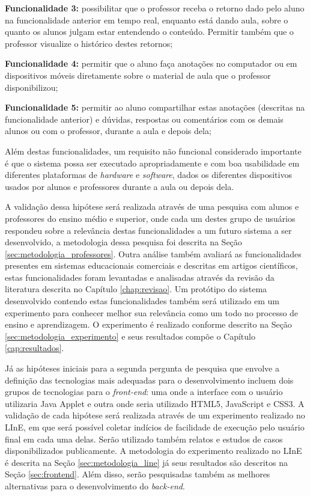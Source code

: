 \textbf{Funcionalidade 3:} possibilitar que o professor receba o retorno dado pelo aluno na funcionalidade anterior em tempo real, enquanto está dando aula, sobre o quanto os alunos julgam estar entendendo o conteúdo. Permitir também que o professor visualize o histórico destes retornos;

\textbf{Funcionalidade 4:} permitir que o aluno faça anotações no computador ou em dispositivos móveis diretamente sobre o material de aula que o professor disponibilizou;

\textbf{Funcionalidade 5:} permitir ao aluno compartilhar estas anotações (descritas na funcionalidade anterior) e dúvidas, respostas ou comentários com os demais alunos ou com o professor, durante a aula e depois dela;

Além destas funcionalidades, um requisito não funcional considerado importante é que o sistema possa ser executado apropriadamente e com boa usabilidade em diferentes plataformas de \emph{hardware} e \emph{software}, dados os diferentes dispositivos usados por alunos e professores durante a aula ou depois dela.

A validação dessa hipótese será realizada através de uma pesquisa com alunos e professores do ensino médio e superior, onde cada um destes grupo de usuários respondeu sobre a relevância destas funcionalidades a um futuro sistema a ser desenvolvido, a metodologia dessa pesquisa foi descrita na Seção \ref{sec:metodologia_professores}. Outra análise também avaliará as funcionalidades presentes em sistemas educacionais comerciais e descritas em artigos científicos, estas funcionalidades foram levantadas e analisadas através da revisão da literatura descrita no Capítulo \ref{chap:revisao}. Um protótipo do sistema desenvolvido contendo estas funcionalidades também será utilizado em um experimento para conhecer melhor sua relevância como um todo no processo de ensino e aprendizagem. O experimento é realizado conforme descrito na Seção \ref{sec:metodologia_experimento} e seus resultados compõe o Capítulo \ref{cap:resultados}.

Já as hipóteses iniciais para a segunda pergunta de pesquisa que envolve a definição das tecnologias mais adequadas para o desenvolvimento incluem dois grupos de tecnologias para o \emph{front-end}: uma onde a interface com o usuário utilizaria Java Applet e outra onde seria utilizado HTML5, JavaScript e CSS3. A validação de cada hipótese será realizada através de um experimento realizado no LInE, em que será possível coletar indícios de facilidade de execução pelo usuário final em cada uma delas. Serão utilizado também relatos e estudos de casos disponibilizados publicamente. A metodologia do experimento realizado no LInE é descrita na Seção \ref{sec:metodologia_line} já seus resultados são descritos na Seção \ref{sec:frontend}. Além disso, serão pesquisadas também as melhores alternativas para o desenvolvimento do \emph{back-end}.

